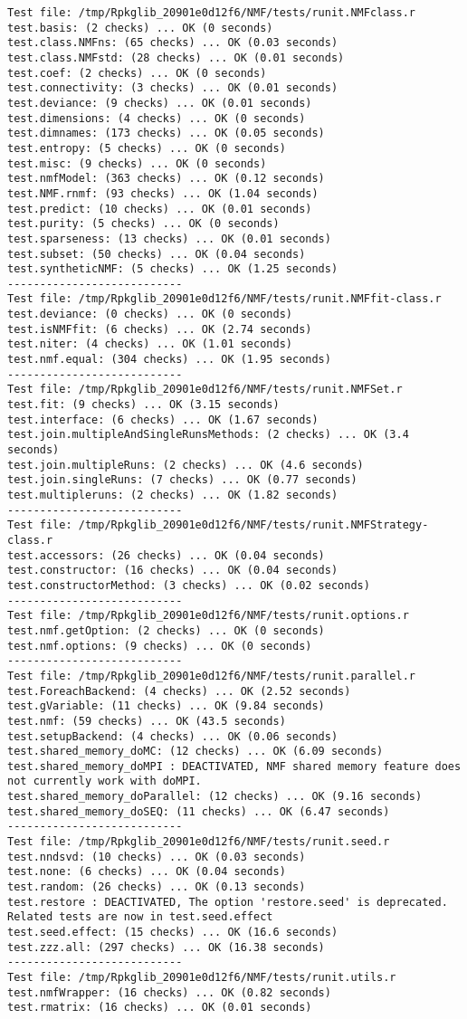 \documentclass[10pt]{article}\usepackage[]{graphicx}\usepackage[]{color}
\begin{document}
\begin{verbatim}
Test file: /tmp/Rpkglib_20901e0d12f6/NMF/tests/runit.NMFclass.r 
test.basis: (2 checks) ... OK (0 seconds)
test.class.NMFns: (65 checks) ... OK (0.03 seconds)
test.class.NMFstd: (28 checks) ... OK (0.01 seconds)
test.coef: (2 checks) ... OK (0 seconds)
test.connectivity: (3 checks) ... OK (0.01 seconds)
test.deviance: (9 checks) ... OK (0.01 seconds)
test.dimensions: (4 checks) ... OK (0 seconds)
test.dimnames: (173 checks) ... OK (0.05 seconds)
test.entropy: (5 checks) ... OK (0 seconds)
test.misc: (9 checks) ... OK (0 seconds)
test.nmfModel: (363 checks) ... OK (0.12 seconds)
test.NMF.rnmf: (93 checks) ... OK (1.04 seconds)
test.predict: (10 checks) ... OK (0.01 seconds)
test.purity: (5 checks) ... OK (0 seconds)
test.sparseness: (13 checks) ... OK (0.01 seconds)
test.subset: (50 checks) ... OK (0.04 seconds)
test.syntheticNMF: (5 checks) ... OK (1.25 seconds)
--------------------------- 
Test file: /tmp/Rpkglib_20901e0d12f6/NMF/tests/runit.NMFfit-class.r 
test.deviance: (0 checks) ... OK (0 seconds)
test.isNMFfit: (6 checks) ... OK (2.74 seconds)
test.niter: (4 checks) ... OK (1.01 seconds)
test.nmf.equal: (304 checks) ... OK (1.95 seconds)
--------------------------- 
Test file: /tmp/Rpkglib_20901e0d12f6/NMF/tests/runit.NMFSet.r 
test.fit: (9 checks) ... OK (3.15 seconds)
test.interface: (6 checks) ... OK (1.67 seconds)
test.join.multipleAndSingleRunsMethods: (2 checks) ... OK (3.4 seconds)
test.join.multipleRuns: (2 checks) ... OK (4.6 seconds)
test.join.singleRuns: (7 checks) ... OK (0.77 seconds)
test.multipleruns: (2 checks) ... OK (1.82 seconds)
--------------------------- 
Test file: /tmp/Rpkglib_20901e0d12f6/NMF/tests/runit.NMFStrategy-class.r 
test.accessors: (26 checks) ... OK (0.04 seconds)
test.constructor: (16 checks) ... OK (0.04 seconds)
test.constructorMethod: (3 checks) ... OK (0.02 seconds)
--------------------------- 
Test file: /tmp/Rpkglib_20901e0d12f6/NMF/tests/runit.options.r 
test.nmf.getOption: (2 checks) ... OK (0 seconds)
test.nmf.options: (9 checks) ... OK (0 seconds)
--------------------------- 
Test file: /tmp/Rpkglib_20901e0d12f6/NMF/tests/runit.parallel.r 
test.ForeachBackend: (4 checks) ... OK (2.52 seconds)
test.gVariable: (11 checks) ... OK (9.84 seconds)
test.nmf: (59 checks) ... OK (43.5 seconds)
test.setupBackend: (4 checks) ... OK (0.06 seconds)
test.shared_memory_doMC: (12 checks) ... OK (6.09 seconds)
test.shared_memory_doMPI : DEACTIVATED, NMF shared memory feature does not currently work with doMPI.
test.shared_memory_doParallel: (12 checks) ... OK (9.16 seconds)
test.shared_memory_doSEQ: (11 checks) ... OK (6.47 seconds)
--------------------------- 
Test file: /tmp/Rpkglib_20901e0d12f6/NMF/tests/runit.seed.r 
test.nndsvd: (10 checks) ... OK (0.03 seconds)
test.none: (6 checks) ... OK (0.04 seconds)
test.random: (26 checks) ... OK (0.13 seconds)
test.restore : DEACTIVATED, The option 'restore.seed' is deprecated. Related tests are now in test.seed.effect
test.seed.effect: (15 checks) ... OK (16.6 seconds)
test.zzz.all: (297 checks) ... OK (16.38 seconds)
--------------------------- 
Test file: /tmp/Rpkglib_20901e0d12f6/NMF/tests/runit.utils.r 
test.nmfWrapper: (16 checks) ... OK (0.82 seconds)
test.rmatrix: (16 checks) ... OK (0.01 seconds)


\end{verbatim}
\end{document}
